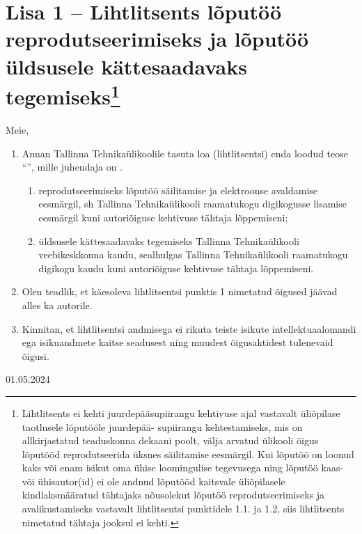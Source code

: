 \newcommand{\licenseFootnote}{Lihtlitsents ei kehti juurdepääsupiirangu kehtivuse ajal vastavalt üliõpilase taotlusele lõputööle juurdepää- supiirangu kehtestamiseks, mis on allkirjastatud teaduskonna dekaani poolt, välja arvatud ülikooli õigus lõputööd reprodutseerida üksnes säilitamise eesmärgil. Kui lõputöö on loonud kaks või enam isikut oma ühise loomingulise tegevusega ning lõputöö kaas- või ühisautor(id) ei ole andnud lõputööd kaitsvale üliõpilasele kindlaksmääratud tähtajaks nõusolekut lõputöö reprodutseerimiseks ja avalikustamiseks vastavalt lihtlitsentsi punktidele 1.1. ja 1.2, siis lihtlitsents nimetatud tähtaja jooksul ei kehti.}

\label{chapter:license}
{\let\clearpage\relax\chapter*{Lisa 1 – Lihtlitsents lõputöö reprodutseerimiseks ja lõputöö üldsusele kättesaadavaks tegemiseks\footnote{\licenseFootnote}}}

Meie, \authorNames{}

\begin{enumerate}[label*=\arabic*.]
    \item Annan Tallinna Tehnikaülikoolile tasuta loa (lihtlitsentsi) enda loodud teose “\thesisTitle{}”, mille juhendaja on \supervisorName{}.
    \begin{enumerate}[label*=\arabic*.]
        \item reprodutseerimiseks lõputöö säilitamise ja elektroonse avaldamise eesmärgil, sh Tallinna Tehnikaülikooli raamatukogu digikogusse lisamise eesmärgil kuni autoriõiguse kehtivuse tähtaja lõppemiseni;
        \item üldsusele kättesaadavaks tegemiseks Tallinna Tehnikaülikooli veebikeskkonna kaudu, sealhulgas Tallinna Tehnikaülikooli raamatukogu digikogu kaudu kuni autoriõiguse kehtivuse tähtaja lõppemiseni.
    \end{enumerate}
    \item Olen teadlik, et käesoleva lihtlitsentsi punktis 1 nimetatud õigused jäävad alles ka autorile.
    \item Kinnitan, et lihtlitsentsi andmisega ei rikuta teiste isikute intellektuaalomandi ega isikuandmete kaitse seadusest ning muudest õigusaktidest tulenevaid õigusi.
\end{enumerate}

01.05.2024

